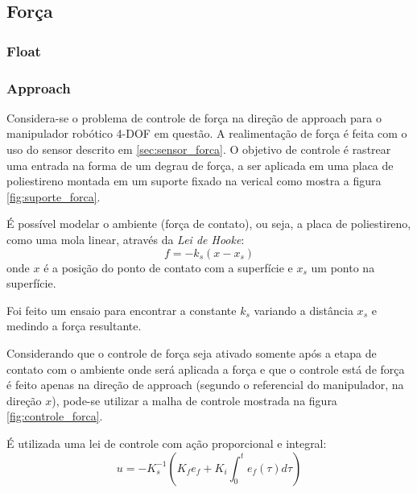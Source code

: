 \subsection{Força}
\subsubsection{Float}
\subsubsection{Approach}
Considera-se o problema de controle de força na direção de approach para o manipulador robótico 4-DOF em questão. A realimentação de força é feita com o uso do sensor descrito em \ref{sec:sensor_forca}. O objetivo de controle é rastrear uma entrada na forma de um degrau de força, a ser aplicada em uma placa de poliestireno montada em um suporte fixado na verical como mostra a figura \ref{fig:suporte_forca}.  

É possível modelar o ambiente (força de contato), ou seja, a placa de poliestireno, como uma mola linear, através da \textit{Lei de Hooke}: \cite{bib:toni}
\begin{equation}
f = -k_s (x - x_s)
\end{equation}
onde $x$ é a posição do ponto de contato com a superfície e $x_s$ um ponto na superfície.

Foi feito um ensaio para encontrar a constante $k_s$ variando a distância $x_s$ e medindo a força resultante.


Considerando que o controle de força seja ativado somente após a etapa de contato com o ambiente onde será aplicada a força e que o controle está de força é feito apenas na direção de approach (segundo o referencial do manipulador, na direção $x$), pode-se utilizar a malha de controle mostrada na figura \ref{fig:controle_forca}.

É utilizada uma lei de controle com ação proporcional e integral:
\begin{equation}
u = -K_s^{-1} (K_fe_f + K_i \int_0^t e_f(\tau)d\tau)
\end{equation}


